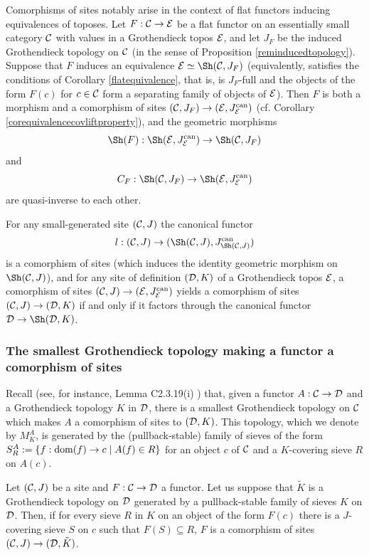 \documentclass[a4paper,12pt]{article}
\begin{document}
Comorphisms of sites notably arise in the context of flat functors inducing equivalences of toposes. Let $F:{\cal C}\to {\cal E}$ be a flat functor on an essentially small category $\cal C$ with values in a Grothendieck topos $\cal E$, and let $J_{F}$ be the induced Grothendieck topology on $\cal C$ (in the sense of Proposition \ref{reminducedtopology}). Suppose that $F$ induces an equivalence ${\cal E} \simeq \Sh({\cal C}, J_{F})$ (equivalently, satisfies the conditions of Corollary \ref{flatequivalence}, that is, is $J_{F}$-full and the objects of the form $F(c)$ for $c\in {\cal C}$ form a separating family of objects of $\cal E$). Then $F$ is both a morphism and a comorphism of sites $({\cal C}, J_{F})\to ({\cal E}, J_{\cal E}^{\textup{can}})$ (cf. Corollary \ref{corequivalencecovliftproperty}), and the geometric morphisms
\[
\Sh(F):\Sh({\cal E}, J_{\cal E}^{\textup{can}}) \to \Sh({\cal C}, J_{F}) 
\]
and 
\[
C_{F}:\Sh({\cal C}, J_{F})  \to \Sh({\cal E}, J_{\cal E}^{\textup{can}})
\]
are quasi-inverse to each other. 

For any small-generated site $({\cal C}, J)$ the canonical functor $$l:({\cal C}, J) \to (\Sh({\cal C}, J), J^{\textup{can}}_{\Sh({\cal C}, J)})$$ is a comorphism of sites (which induces the identity geometric morphism on $\Sh({\cal C}, J)$), and for any site of definition $({\cal D}, K)$ of a Grothendieck topos $\cal E$, a comorphism of sites $({\cal C}, J)\to ({\cal E}, J^{\textup{can}}_{\cal E})$ yields a comorphism of sites $({\cal C}, J)\to ({\cal D}, K)$ if and only if it factors through the canonical functor ${\cal D}\to \Sh({\cal D}, K)$. 



\subsubsection{The smallest Grothendieck topology making a functor a comorphism of sites}\label{sec:smallestgrothendiecktopologycomorphism}

Recall (see, for instance, Lemma C2.3.19(i) \cite{El}) that, given a functor $A:{\cal C}\to {\cal D}$ and a Grothendieck topology $K$ in $\cal D$, there is a smallest Grothendieck topology on $\cal C$ which makes $A$ a comorphism of sites to $({\cal D}, K)$. This topology, which we denote by $M^{A}_{K}$, is generated by the (pullback-stable) family of sieves of the form $S^{A}_{R}:=\{f:\textup{dom}(f)\to c \mid A(f)\in R\}$ for an object $c$ of $\cal C$ and a $K$-covering sieve $R$ on $A(c)$. 

\begin{lemma}\label{lemmacomorphismsofsitesgenerators}
	Let $({\cal C}, J)$ be a site and $F:{\cal C}\to {\cal D}$ a functor. Let us suppose that $\tilde{K}$ is a Grothendieck topology on $\cal D$ generated by a pullback-stable family of sieves $K$ on $\cal D$. Then, if for every sieve $R$ in $K$ on an object of the form $F(c)$ there is a $J$-covering sieve $S$ on $c$ such that $F(S)\subseteq R$, $F$ is a comorphism of sites $({\cal C}, J)\to ({\cal D}, \tilde{K})$. 
\end{lemma}
\end{document}
